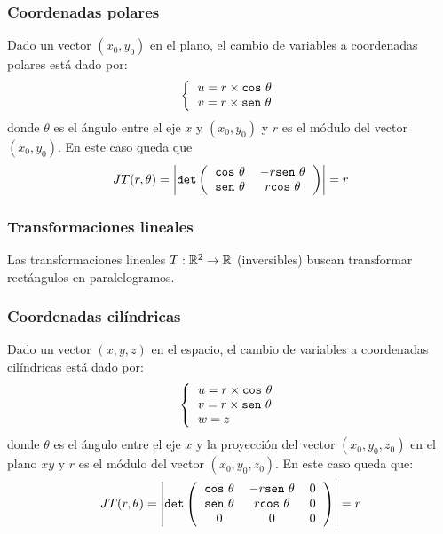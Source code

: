 \subsubsection{Coordenadas polares}
Dado un vector $(x_0,y_0)$ en el plano, el cambio de variables a coordenadas polares está dado por:
\begin{align*}
\left\{
\begin{tabular}{c}
    $u = r\times\texttt{cos}~\theta$ \\
    $v = r\times\texttt{sen}~\theta$ \\
\end{tabular}
\right.
\end{align*}
donde $\theta$ es el ángulo entre el eje $x$ y $(x_0,y_0)$ y $r$ es el módulo del vector $(x_0,y_0)$. En este caso queda que 
\begin{align*}
JT(r,\theta) = \left|\texttt{det}\left(
\begin{tabular}{c c}
$\texttt{cos}~\theta$ & $-r\texttt{sen}~\theta$ \\
$\texttt{sen}~\theta$ & $r\texttt{cos}~\theta$ \\
\end{tabular}
\right)\right| = r
\end{align*}

\subsubsection{Transformaciones lineales}
Las transformaciones lineales $T:\mathbb{R}^2\to\mathbb{R}$ (inversibles) buscan transformar rectángulos en paralelogramos.

\subsubsection{Coordenadas cilíndricas}
Dado un vector $(x,y,z)$ en el espacio, el cambio de variables a coordenadas cilíndricas está dado por:
\begin{align*}
\left\{
\begin{tabular}{l}
    $u = r\times\texttt{cos}~\theta$ \\
    $v = r\times\texttt{sen}~\theta$ \\
    $w = z$
\end{tabular}
\right.
\end{align*}
donde $\theta$ es el ángulo entre el eje $x$ y la proyección del vector $(x_0,y_0,z_0)$ en el plano $xy$ y $r$ es el módulo del vector $(x_0,y_0, z_0)$. En este caso queda que:
\begin{align*}
JT(r,\theta) = \left|\texttt{det}\left(
\begin{tabular}{c c c}
$\texttt{cos}~\theta$ & $-r\texttt{sen}~\theta$ & 0\\
$\texttt{sen}~\theta$ & $r\texttt{cos}~\theta$ & 0\\0 & 0 & 0 \\
\end{tabular}
\right)\right| = r
\end{align*}


